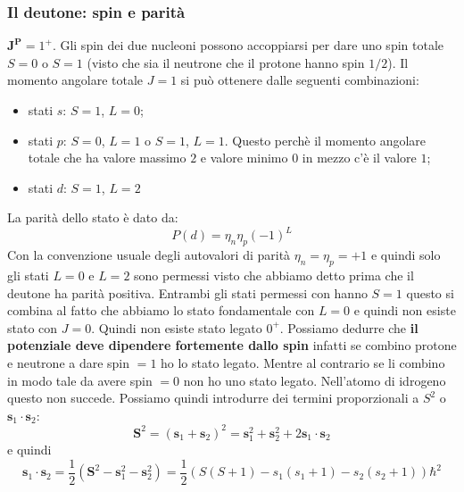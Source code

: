 \subsubsection{Il deutone: spin e parità }
$\mathbf{J^P}=1^+$. Gli spin dei due nucleoni possono accoppiarsi per dare uno spin totale $S=0$ o $S=1$ (visto che sia il neutrone che il protone hanno spin $1/2$). Il momento angolare totale $J=1$ si può ottenere dalle seguenti combinazioni:
\begin{itemize}
    \item stati $s$: $S=1$, $L=0$;
    \item stati $p$: $S=0$, $L=1$ o $S=1$, $L=1$. Questo perchè il momento angolare totale che ha valore massimo $2$ e valore minimo $0$ in mezzo c'è il valore $1$;
    \item stati $d$: $S=1$, $L=2$
\end{itemize}
La parità dello stato è dato da:
\begin{equation*}
    P(d)=\eta_n\eta_p(-1)^L
\end{equation*}
Con la convenzione usuale degli autovalori di parità $\eta_n=\eta_p=+1$ e quindi solo gli stati $L=0$ e $L=2$ sono permessi visto che abbiamo detto prima che il deutone ha parità positiva. Entrambi gli stati permessi con hanno $S=1$ questo si combina al fatto che abbiamo lo stato fondamentale con $L=0$ e quindi non esiste stato con $J=0$. Quindi non esiste stato legato $0^+$. Possiamo dedurre che \textbf{il potenziale deve dipendere fortemente dallo spin} infatti se combino protone e neutrone a dare spin $=1$ ho lo stato legato. Mentre al contrario se li combino in modo tale da avere spin $=0$ non ho uno stato legato. Nell'atomo di idrogeno questo non succede. Possiamo quindi introdurre dei termini proporzionali a $S^2$ o $\mathbf{s}_1\cdot\mathbf{s}_2$:
\begin{equation*}
    \mathbf{S}^2=(\mathbf{s}_1+\mathbf{s}_2)^2=\mathbf{s}_1^2+\mathbf{s}_2^2+2\mathbf{s}_1\cdot\mathbf{s}_2
\end{equation*}
e quindi 
\begin{equation*}
    \mathbf{s}_1\cdot\mathbf{s}_2=\frac{1}{2}(\mathbf{S}^2-\mathbf{s}_1^2-\mathbf{s}_2^2)=\frac{1}{2}(S(S+1)-s_1(s_1+1)-s_2(s_2+1))\hbar^2
\end{equation*}

